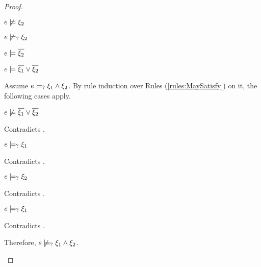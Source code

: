 \begin{proof}
\begin{byCases}
\begin{byCases}
\begin{pfsteps*}
        \item $e \not\models \xi_2$  
        \item $e \not\models_{?} \xi_2$  
        \item $e \models \overline{\xi_2}$  
        \item $e \models \overline{\xi_1} \vee \overline{\xi_2}$  
        \end{pfsteps*}
        Assume $e \models_{?} \xi_1 \wedge \xi_2$. By rule induction over Rules (\ref{rules:MaySatisfy}) on it, the following cases apply.
        \begin{byCases}
        \item[\text{(\ref{rule:CMSNotVal})}]
            \begin{pfsteps*}
            \item $e \not\models \overline{\xi_1} \vee \overline{\xi_2}$ 
            \end{pfsteps*}
            Contradicts .
        \item[\text{(\ref{rule:CMSAnd1})}]
            \begin{pfsteps*}
            \item $e \models_{?} \xi_1$ 
            \end{pfsteps*}
            Contradicts .
        \item[\text{(\ref{rule:CMSAnd2})}]
            \begin{pfsteps*}
            \item $e \models_{?} \xi_2$ 
            \end{pfsteps*}
            Contradicts .
        \item[\text{(\ref{rule:CMSAnd3})}]
            \begin{pfsteps*}
            \item $e \models_{?} \xi_1$ 
            \end{pfsteps*}
            Contradicts .
        \end{byCases}
        Therefore, $e \not\models_{?} \xi_1 \wedge \xi_2$.
        

\end{byCases}
\end{byCases}
\end{proof}
